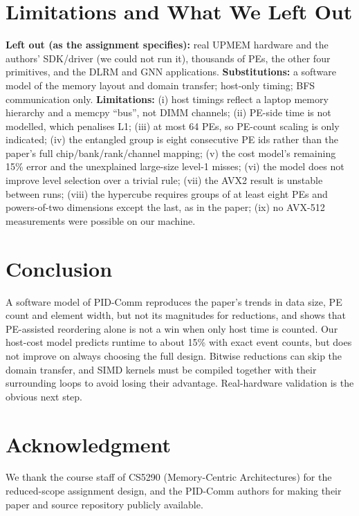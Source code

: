 \documentclass[conference]{IEEEtran}
\begin{document}
\section{Limitations and What We Left Out}
\textbf{Left out (as the assignment specifies):} real UPMEM hardware and the authors' SDK/driver (we could not run it), thousands of PEs, the other four primitives, and the DLRM and GNN applications. \textbf{Substitutions:} a software model of the memory layout and domain transfer; host-only timing; BFS communication only. \textbf{Limitations:} (i) host timings reflect a laptop memory hierarchy and a memcpy ``bus'', not DIMM channels; (ii) PE-side time is not modelled, which penalises L1; (iii) at most 64 PEs, so PE-count scaling is only indicated; (iv) the entangled group is eight consecutive PE ids rather than the paper's full chip/bank/rank/channel mapping; (v) the cost model's remaining 15\% error and the unexplained large-size level-1 misses; (vi) the model does not improve level selection over a trivial rule; (vii) the AVX2 result is unstable between runs; (viii) the hypercube requires groups of at least eight PEs and powers-of-two dimensions except the last, as in the paper; (ix) no AVX-512 measurements were possible on our machine.

\section{Conclusion}
A software model of PID-Comm reproduces the paper's trends in data size, PE count and element width, but not its magnitudes for reductions, and shows that PE-assisted reordering alone is not a win when only host time is counted. Our host-cost model predicts runtime to about 15\% with exact event counts, but does not improve on always choosing the full design. Bitwise reductions can skip the domain transfer, and SIMD kernels must be compiled together with their surrounding loops to avoid losing their advantage. Real-hardware validation is the obvious next step.

\section*{Acknowledgment}
We thank the course staff of CS5290 (Memory-Centric Architectures) for the reduced-scope assignment design, and the PID-Comm authors for making their paper and source repository publicly available.
\end{document}
